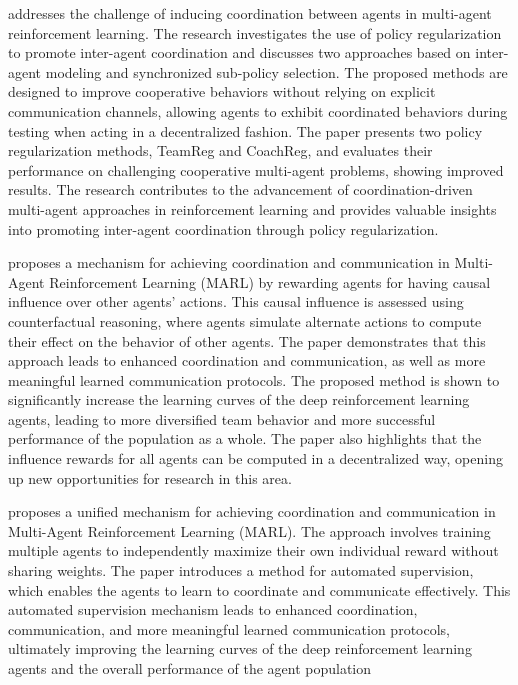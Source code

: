 \documentclass[runningheads]{llncs}
\begin{document}
\cite{Roy2020} addresses the challenge of inducing coordination between agents in multi-agent reinforcement learning. The research investigates the use of policy regularization to promote inter-agent coordination and discusses two approaches based on inter-agent modeling and synchronized sub-policy selection. The proposed methods are designed to improve cooperative behaviors without relying on explicit communication channels, allowing agents to exhibit coordinated behaviors during testing when acting in a decentralized fashion. The paper presents two policy regularization methods, TeamReg and CoachReg, and evaluates their performance on challenging cooperative multi-agent problems, showing improved results. The research contributes to the advancement of coordination-driven multi-agent approaches in reinforcement learning and provides valuable insights into promoting inter-agent coordination through policy regularization.

\cite{Jaques2019} proposes a mechanism for achieving coordination and communication in Multi-Agent Reinforcement Learning (MARL) by rewarding agents for having causal influence over other agents' actions. This causal influence is assessed using counterfactual reasoning, where agents simulate alternate actions to compute their effect on the behavior of other agents. The paper demonstrates that this approach leads to enhanced coordination and communication, as well as more meaningful learned communication protocols. The proposed method is shown to significantly increase the learning curves of the deep reinforcement learning agents, leading to more diversified team behavior and more successful performance of the population as a whole. The paper also highlights that the influence rewards for all agents can be computed in a decentralized way, opening up new opportunities for research in this area.

\cite{Chongjie2008} proposes a unified mechanism for achieving coordination and communication in Multi-Agent Reinforcement Learning (MARL). The approach involves training multiple agents to independently maximize their own individual reward without sharing weights. The paper introduces a method for automated supervision, which enables the agents to learn to coordinate and communicate effectively. This automated supervision mechanism leads to enhanced coordination, communication, and more meaningful learned communication protocols, ultimately improving the learning curves of the deep reinforcement learning agents and the overall performance of the agent population
\end{document}
